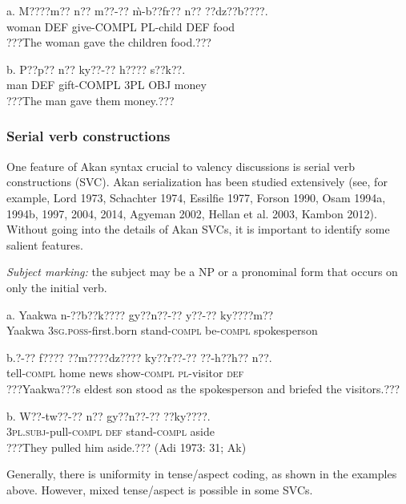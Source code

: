 \documentclass[output=paper]{langsci/langscibook}
\begin{document}
\ea
\gll a.  M????m??    n??  m??-??    \`{m}-b??fr??  n??  ??dz??b????.\\
       woman    DEF  give-COMPL  PL-child  DEF  food\\
\glt   ???The woman gave the children food.???
\z

\ea
\gll  b.  P??p??  n??  ky??-??    h????    s??k??.\\
       man  DEF  gift-COMPL  3PL OBJ  money\\
\glt   ???The man gave them money.???  
\z

\subsubsection{Serial verb constructions}

One feature of Akan syntax crucial to valency discussions is serial verb constructions (\textsc{SVC}). Akan serialization has been studied extensively (see, for example, Lord 1973, Schachter 1974, Essilfie 1977, Forson 1990, Osam 1994a, 1994b, 1997, 2004, 2014, Agyeman 2002, Hellan et al. 2003, Kambon 2012). Without going into the details of Akan SVCs, it is important to identify some salient features.

\begin{styleListei}
\emph{Subject marking:} the subject may be a NP or a pronominal form that occurs on only the initial verb. 
\end{styleListei}


\ea
\gll a.  Yaakwa  n-??b??k????     gy??n??-??   y??-??     ky????m??\\
       Yaakwa  \textsc{3sg.poss}{}-first.born  stand-\textsc{compl}  be-\textsc{compl}   spokesperson\\
       \z
       
\ea
\gll b.?-??     f????   ??m????dz????  ky??r??-??   ??-h??h??    n??.\\
       tell-\textsc{compl}  home  news    show-\textsc{compl}  \textsc{pl}{}-visitor  \textsc{def}\\
\glt   ???Yaakwa???s eldest son stood as the spokesperson and briefed the visitors.??? \citep[83]{Krampah1970}
\z

\ea
\gll  b.  W??-tw??-??    n??  gy??n??-??  ??ky????.\\
       \textsc{3pl.subj}{}-pull\textsc{{}-compl}  \textsc{def}  stand-\textsc{compl}  aside\\
\glt   ???They pulled him aside.??? (Adi 1973: 31; Ak)
\z

Generally, there is uniformity in tense/aspect coding, as shown in the examples above. However, mixed tense/aspect is possible in some SVCs. 
\end{document}
